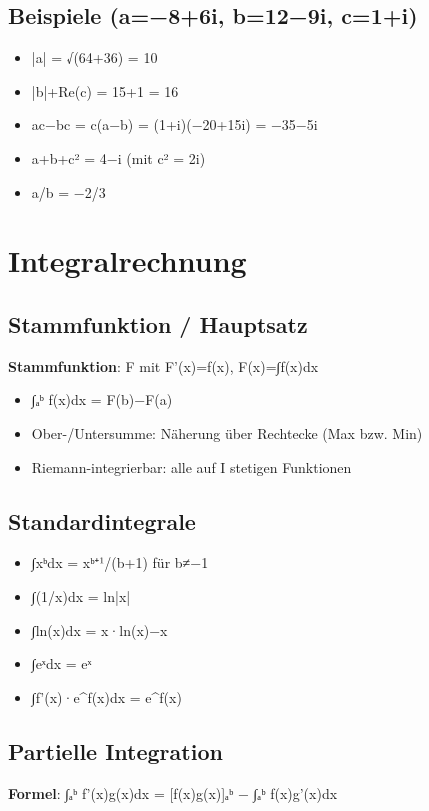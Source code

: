 \documentclass[11pt, a4paper]{article}
\begin{document}
\subsection{Beispiele (a=−8+6i, b=12−9i, c=1+i)}
\begin{itemize}
  \item |a| = √(64+36) = 10
  \item |b|+Re(c) = 15+1 = 16
  \item ac−bc = c(a−b) = (1+i)(−20+15i) = −35−5i
  \item a+b+c² = 4−i (mit c² = 2i)
  \item a/b = −2/3
\end{itemize}


\section{Integralrechnung}


\subsection{Stammfunktion / Hauptsatz}
\textbf{Stammfunktion}: F mit F'(x)=f(x), F(x)=∫f(x)dx

\begin{itemize}
  \item ∫ₐᵇ f(x)dx = F(b)−F(a)
  \item Ober-/Untersumme: Näherung über Rechtecke (Max bzw. Min)
  \item Riemann-integrierbar: alle auf I stetigen Funktionen
\end{itemize}


\subsection{Standardintegrale}
\begin{itemize}
  \item ∫xᵇdx = xᵇ⁺¹/(b+1) für b≠−1
  \item ∫(1/x)dx = ln|x|
  \item ∫ln(x)dx = x·ln(x)−x
  \item ∫eˣdx = eˣ
  \item ∫f'(x)·e\textasciicircum{}f(x)dx = e\textasciicircum{}f(x)
\end{itemize}


\subsection{Partielle Integration}
\textbf{Formel}: ∫ₐᵇ f'(x)g(x)dx = [f(x)g(x)]ₐᵇ − ∫ₐᵇ f(x)g'(x)dx
\end{document}
